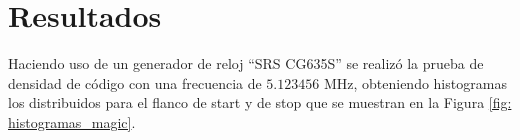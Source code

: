\section{Resultados}
Haciendo uso de un generador de reloj ``SRS CG635S'' se realizó la prueba de densidad de código
con una frecuencia de $5.123456$ MHz, obteniendo histogramas los
distribuidos para el flanco de start y de stop que se muestran en la Figura \ref{fig: histogramas_magic}.
\begin{figure}[H]
     \centering
     \begin{subfigure}{0.45\textwidth}
           \centering
     \end{subfigure}%
     \hspace{10pt}%
     \begin{subfigure}{0.45\textwidth}
           \centering
\end{subfigure}
\end{figure}
